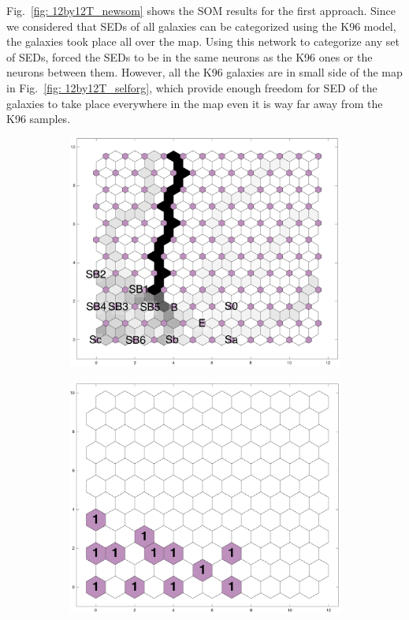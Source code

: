     Fig.~\ref{fig: 12by12T_newsom} shows the SOM results for the first approach. 
    Since we considered that SEDs of all galaxies can be categorized using the K96 model, the galaxies took place all over the map.
    Using this network to categorize any set of SEDs, forced the SEDs to be in the same neurons as the K96 ones or the neurons between them.
    However, all the K96 galaxies are in small side of the map in Fig.~\ref{fig: 12by12T_selforg}, which provide enough freedom for SED of the galaxies to take place everywhere in the map even it is way far away from the K96 samples.
    \begin{figure}
        \begin{subfigure}[b]{0.5\textwidth}
            \centering
            \includegraphics[width=\textwidth]{../images0.01/2d/dist_12_by_self_org_res12.png}
        \end{subfigure}
        \hfill
        \begin{subfigure}[b]{0.5\textwidth}
            \includegraphics[width=\textwidth]{../images0.01/2d/hit_t_12_by_self_org_res12.png}

\end{subfigure}
\end{figure}
